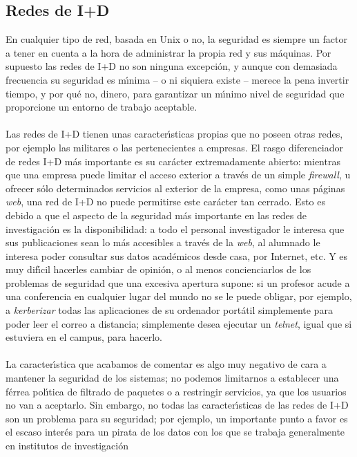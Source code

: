 \subsection{Redes de I+D}
En cualquier tipo de red, basada en Unix o no, la seguridad es siempre un factor
a tener en cuenta a la hora de administrar la propia red y sus m\'aquinas. Por 
supuesto las redes de I+D no son ninguna excepci\'on, y aunque con demasiada 
frecuencia su seguridad es m\'{\i}nima -- o ni siquiera existe -- merece la 
pena invertir tiempo, y por qu\'e no, dinero, para garantizar un m\'{\i}nimo 
nivel de seguridad que proporcione un entorno de trabajo aceptable.\\
\\Las redes de I+D tienen unas caracter\'{\i}sticas propias que no poseen otras
redes, por ejemplo las militares o las pertenecientes a empresas. El rasgo
diferenciador de redes I+D m\'as importante es su car\'acter extremadamente
abierto: mientras que una empresa puede limitar el acceso exterior a trav\'es
de un simple {\it firewall}, u ofrecer s\'olo determinados servicios al exterior
de la empresa, como unas p\'aginas {\it web}, una red de I+D no puede permitirse
este car\'acter tan cerrado. Esto es debido a que el aspecto de la seguridad
m\'as importante en las redes de investigaci\'on es la disponibilidad: a todo
el personal investigador le interesa que sus publicaciones sean lo m\'as 
accesibles a trav\'es de la {\it web}, al alumnado le interesa poder consultar 
sus datos acad\'emicos desde casa, por Internet, etc. Y es muy dif\'{\i}cil 
hacerles cambiar de opini\'on, o al menos concienciarlos de los problemas de
seguridad que una excesiva apertura supone: si un profesor acude a una 
conferencia en cualquier lugar del mundo no se le puede obligar, por ejemplo,
a {\it kerberizar} todas las aplicaciones de su ordenador port\'atil 
simplemente para poder leer el correo a distancia; simplemente desea ejecutar 
un {\it telnet}, igual que si estuviera en el campus, para hacerlo.\\
\\La caracter\'{\i}stica que acabamos de comentar es algo muy negativo de 
cara a mantener la seguridad de los sistemas; no podemos limitarnos a establecer
una f\'errea pol\'{\i}tica de filtrado de paquetes o a restringir servicios, ya
que los usuarios no van a aceptarlo. Sin embargo, no todas las 
caracter\'{\i}sticas de las redes de I+D son un problema para su seguridad; por
ejemplo, un importante punto a favor es el escaso inter\'es para un pirata de 
los datos con los que se trabaja generalmente en institutos de investigaci\'on
